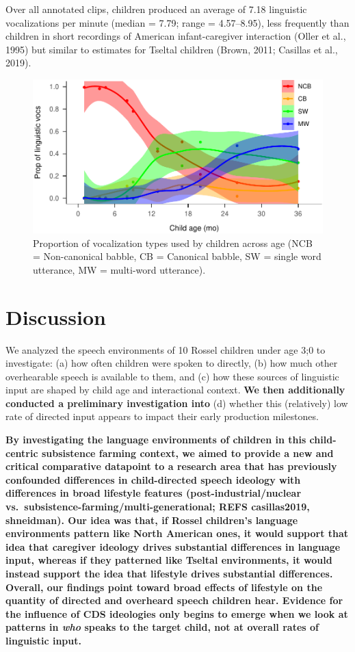 \documentclass[,man,floatsintext]{apa6}
\begin{document}
Over all annotated clips, children produced an average of 7.18
linguistic vocalizations per minute (median = 7.79; range = 4.57--8.95),
less frequently than children in short recordings of American
infant-caregiver interaction (Oller et al., 1995) but similar to
estimates for Tseltal children (Brown, 2011; Casillas et al., 2019).

\begin{figure}
\centering
\includegraphics{Yeli-CLE_files/figure-latex/fig4-1.pdf}
\caption{\label{fig:fig4}Proportion of vocalization types used by children
across age (NCB = Non-canonical babble, CB = Canonical babble, SW =
single word utterance, MW = multi-word utterance).}
\end{figure}

\section{Discussion}\label{disc}

We analyzed the speech environments of 10 Rossel children under age 3;0
to investigate: (a) how often children were spoken to directly, (b) how
much other overhearable speech is available to them, and (c) how these
sources of linguistic input are shaped by child age and interactional
context. \textbf{We then additionally conducted a preliminary
investigation into} (d) whether this (relatively) low rate of directed
input appears to impact their early production milestones.

\textbf{By investigating the language environments of children in this
child-centric subsistence farming context, we aimed to provide a new and
critical comparative datapoint to a research area that has previously
confounded differences in child-directed speech ideology with
differences in broad lifestyle features (post-industrial/nuclear
vs.~subsistence-farming/multi-generational; REFS casillas2019,
shneidman). Our idea was that, if Rossel children's language
environments pattern like North American ones, it would support that
idea that caregiver ideology drives substantial differences in language
input, whereas if they patterned like Tseltal environments, it would
instead support the idea that lifestyle drives substantial differences.
Overall, our findings point toward broad effects of lifestyle on the
quantity of directed and overheard speech children hear. Evidence for
the influence of CDS ideologies only begins to emerge when we look at
patterns in \emph{who} speaks to the target child, not at overall rates
of linguistic input.}
\end{document}
